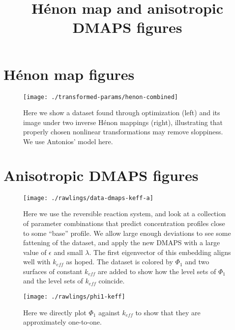 \documentclass[11pt]{article}
\title{H\'{e}non map and anisotropic DMAPS figures}
\begin{document}
\maketitle

\section{H\'{e}non map figures}

\begin{figure}[htbp]
  \centering
  \texttt{[image: ./transformed-params/henon-combined]}
  \caption{Here we show a dataset found through optimization (left)
    and its image under two inverse H\'{e}non mappings (right),
    illustrating that properly chosen nonlinear transformations may
  remove sloppiness. We use Antonios' model here.}
\end{figure}

\section{Anisotropic DMAPS figures}


\begin{figure}[htbp]
  \centering
  \texttt{[image: ./rawlings/data-dmaps-keff-a]}
  \caption{Here we use the reversible reaction system, and look at a
    collection of parameter combinations that predict concentration
    profiles close to some ``base'' profile. We allow large enough
    deviations to see some fattening of the dataset, and apply the new
  DMAPS with a large value of $\epsilon$ and small $\lambda$. The
  first eigenvector of this embedding aligns well with $k_{eff}$ as
  hoped. The dataset is colored by $\Phi_1$ and two surfaces of
  constant $k_{eff}$ are added to show how the level sets of $\Phi_1$
  and the level sets of $k_{eff}$ coincide.}
\end{figure}

\begin{figure}[htbp]
  \centering
  \texttt{[image: ./rawlings/phi1-keff]}
  \caption{Here we directly plot $\Phi_1$ against $k_{eff}$ to show
    that they are approximately one-to-one.}
\end{figure}

% 
% 
\end{document}
